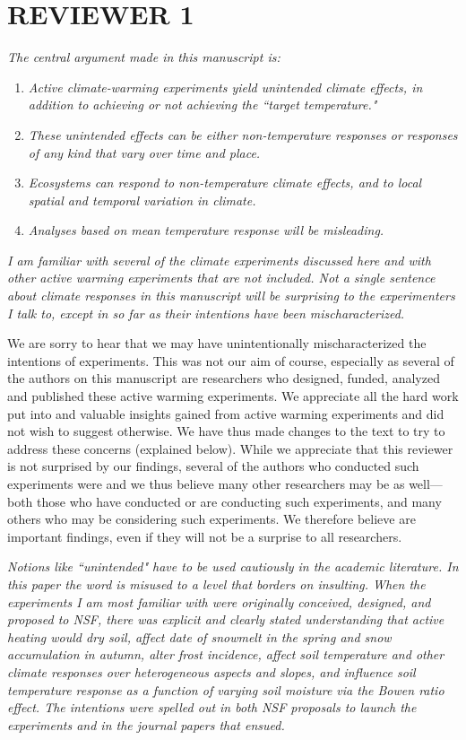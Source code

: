 \documentclass[11pt,a4paper]{letter}
\begin{document}
\begin{letter}{}
\section {REVIEWER 1}

\emph{The central argument made in this manuscript is:}
\begin{enumerate}
\item \emph{Active climate-warming experiments yield unintended climate effects, in addition to achieving or not achieving the ``target temperature."}   
\item \emph{These unintended effects can be either non-temperature responses or responses of any kind that vary over time and place.}
\item \emph{Ecosystems can respond to non-temperature climate effects, and to local spatial and temporal variation in climate.}
\item \emph{Analyses based on mean temperature response will be misleading.}
\end{enumerate}

\emph{I am familiar with several of the climate experiments discussed here and with other active warming experiments that are not included.  Not a single sentence about climate responses in this manuscript will be surprising to the experimenters I talk to, except in so far as their intentions have been mischaracterized.}  

We are sorry to hear that we may have unintentionally mischaracterized the intentions of experiments. This was not our aim of course, especially as several of the authors on this manuscript are researchers who designed, funded, analyzed and published these active warming experiments. We appreciate all the hard work put into and valuable insights gained from active warming experiments and did not wish to suggest otherwise. We have thus made changes to the text to try to address these concerns (explained below). While we appreciate that this reviewer is not surprised by our findings, several of the authors who conducted such experiments were and we thus believe many other researchers may be as well---both those who have conducted or are conducting such experiments, and many others who may be considering such experiments. We therefore believe are important findings, even if they will not be a surprise to all researchers.

\emph{Notions like ``unintended" have to be used cautiously in the academic literature.  In this paper the word is misused to a level that borders on insulting.  When the experiments I am most familiar with were originally conceived, designed, and proposed to NSF, there was explicit and clearly stated understanding that active heating would dry soil, affect date of snowmelt in the spring and snow accumulation in autumn, alter frost incidence, affect soil temperature and other climate responses over heterogeneous aspects and slopes, and influence soil temperature response as a function of varying soil moisture via the Bowen ratio effect.  The intentions were spelled out in both NSF proposals to launch the experiments and in the journal papers that ensued.}


\end{letter}
\end{document}
